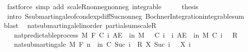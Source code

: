 \begin{isabellebody}
\ {\isacharparenleft}{\kern0pt}fastforce\ simp\ add{\isacharcolon}{\kern0pt}\ scaleR{\isacharunderscore}{\kern0pt}nonneg{\isacharunderscore}{\kern0pt}nonneg\ integrable{\isacharparenright}{\kern0pt}\isanewline
\ \ \isamarkupfalse%
\ \isamarkupfalse%
\ {\isacharquery}{\kern0pt}thesis\ \isamarkupfalse%
\ {\isacharparenleft}{\kern0pt}intro\ S{\isachardot}{\kern0pt}submartingale{\isacharunderscore}{\kern0pt}of{\isacharunderscore}{\kern0pt}cond{\isacharunderscore}{\kern0pt}exp{\isacharunderscore}{\kern0pt}diff{\isacharunderscore}{\kern0pt}Suc{\isacharunderscore}{\kern0pt}nonneg\ Bochner{\isacharunderscore}{\kern0pt}Integration{\isachardot}{\kern0pt}integrable{\isacharunderscore}{\kern0pt}sum{\isacharcomma}{\kern0pt}\ blast{\isacharplus}{\kern0pt}{\isacharparenright}{\kern0pt}\isanewline
{}\isamarkupfalse%
%
\endisatagproof
{\isafoldproof}%
%
\isadelimproof
\isanewline
%
\endisadelimproof
\isanewline
{}\isamarkupfalse%
\ {\isacharparenleft}{\kern0pt}\ nat{\isacharunderscore}{\kern0pt}submartingale{\isacharunderscore}{\kern0pt}linorder{\isacharparenright}{\kern0pt}\ partial{\isacharunderscore}{\kern0pt}sum{\isacharunderscore}{\kern0pt}scaleR{\isacharprime}{\kern0pt}{\isacharcolon}{\kern0pt}\isanewline
\ \ \ {\isachardoublequoteopen}nat{\isacharunderscore}{\kern0pt}predictable{\isacharunderscore}{\kern0pt}process\ M\ F\ C{\isachardoublequoteclose}\ {\isachardoublequoteopen}{\isasymAnd}i{\isachardot}{\kern0pt}\ AE\ {\isasymxi}\ in\ M{\isachardot}{\kern0pt}\ {}\ {\isasymle}\ C\ i\ {\isasymxi}{\isachardoublequoteclose}\ {\isachardoublequoteopen}{\isasymAnd}i{\isachardot}{\kern0pt}\ AE\ {\isasymxi}\ in\ M{\isachardot}{\kern0pt}\ C\ i\ {\isasymxi}\ {\isasymle}\ R{\isachardoublequoteclose}\isanewline
\ \ \ {\isachardoublequoteopen}nat{\isacharunderscore}{\kern0pt}submartingale\ M\ F\ {\isacharparenleft}{\kern0pt}{\isasymlambda}n\ {\isasymxi}{\isachardot}{\kern0pt}\ {\isasymSum}i{\isacharless}{\kern0pt}n{\isachardot}{\kern0pt}\ C\ {\isacharparenleft}{\kern0pt}Suc\ i{\isacharparenright}{\kern0pt}\ {\isasymxi}\ {\isacharasterisk}{\kern0pt}\isactrlsub R\ {\isacharparenleft}{\kern0pt}X\ {\isacharparenleft}{\kern0pt}Suc\ i{\isacharparenright}{\kern0pt}\ {\isasymxi}\ {\isacharminus}{\kern0pt}\ X\ i\ {\isasymxi}{\isacharparenright}{\kern0pt}{\isacharparenright}{\kern0pt}{\isachardoublequoteclose}\isanewline
%
\isadelimproof
%
\endisadelimproof
%
\isatagproof
{}\isamarkupfalse%
\ {\isacharminus}{\kern0pt}\isanewline

\end{isabellebody}
